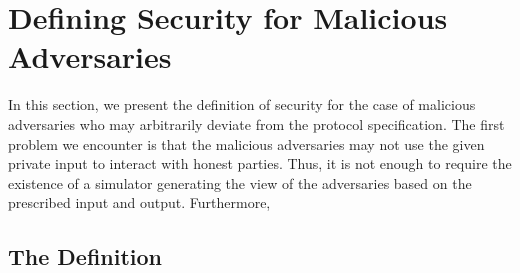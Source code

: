 \section{Defining Security for Malicious Adversaries}
In this section, we present the definition of security for the case of malicious adversaries who may arbitrarily deviate from the protocol specification. The first problem we encounter is that the malicious adversaries may not use the given private input to interact with honest parties. Thus, it is not enough to require the existence of a simulator generating the view of the adversaries based on the prescribed input and output. Furthermore,
\subsection{The Definition}

